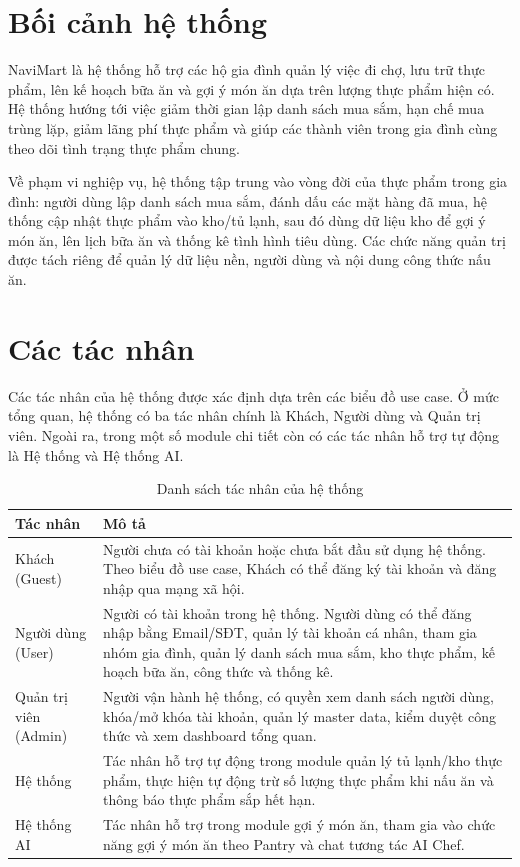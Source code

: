 \documentclass[../main.tex]{subfiles}
\begin{document}
\setlength{\tabcolsep}{3pt}

\section{Bối cảnh hệ thống}
NaviMart là hệ thống hỗ trợ các hộ gia đình quản lý việc đi chợ, lưu trữ thực phẩm, lên kế hoạch bữa ăn và gợi ý món ăn dựa trên lượng thực phẩm hiện có. Hệ thống hướng tới việc giảm thời gian lập danh sách mua sắm, hạn chế mua trùng lặp, giảm lãng phí thực phẩm và giúp các thành viên trong gia đình cùng theo dõi tình trạng thực phẩm chung.

Về phạm vi nghiệp vụ, hệ thống tập trung vào vòng đời của thực phẩm trong gia đình: người dùng lập danh sách mua sắm, đánh dấu các mặt hàng đã mua, hệ thống cập nhật thực phẩm vào kho/tủ lạnh, sau đó dùng dữ liệu kho để gợi ý món ăn, lên lịch bữa ăn và thống kê tình hình tiêu dùng. Các chức năng quản trị được tách riêng để quản lý dữ liệu nền, người dùng và nội dung công thức nấu ăn.

\section{Các tác nhân}
Các tác nhân của hệ thống được xác định dựa trên các biểu đồ use case. Ở mức tổng quan, hệ thống có ba tác nhân chính là Khách, Người dùng và Quản trị viên. Ngoài ra, trong một số module chi tiết còn có các tác nhân hỗ trợ tự động là Hệ thống và Hệ thống AI.

\begin{table}[H]
    \centering
    \caption{Danh sách tác nhân của hệ thống}
    \begin{tabular}{|p{3.4cm}|p{9.9cm}|}
        \hline
        \cellcolor[HTML]{D5F5E3}\textbf{Tác nhân} & \cellcolor[HTML]{D5F5E3}\textbf{Mô tả} \\ \hline
        Khách (Guest) & Người chưa có tài khoản hoặc chưa bắt đầu sử dụng hệ thống. Theo biểu đồ use case, Khách có thể đăng ký tài khoản và đăng nhập qua mạng xã hội. \\ \hline
        Người dùng (User) & Người có tài khoản trong hệ thống. Người dùng có thể đăng nhập bằng Email/SĐT, quản lý tài khoản cá nhân, tham gia nhóm gia đình, quản lý danh sách mua sắm, kho thực phẩm, kế hoạch bữa ăn, công thức và thống kê. \\ \hline
        Quản trị viên (Admin) & Người vận hành hệ thống, có quyền xem danh sách người dùng, khóa/mở khóa tài khoản, quản lý master data, kiểm duyệt công thức và xem dashboard tổng quan. \\ \hline
        Hệ thống & Tác nhân hỗ trợ tự động trong module quản lý tủ lạnh/kho thực phẩm, thực hiện tự động trừ số lượng thực phẩm khi nấu ăn và thông báo thực phẩm sắp hết hạn. \\ \hline
        Hệ thống AI & Tác nhân hỗ trợ trong module gợi ý món ăn, tham gia vào chức năng gợi ý món ăn theo Pantry và chat tương tác AI Chef. \\ \hline
    \end{tabular}
\end{table}
\end{document}
